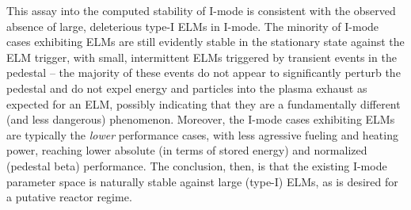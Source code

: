 This assay into the computed stability of I-mode is consistent with the observed absence of large, deleterious type-I ELMs in I-mode.  The minority of I-mode cases exhibiting ELMs are still evidently stable in the stationary state against the ELM trigger, with small, intermittent ELMs triggered by transient events in the pedestal -- the majority of these events do not appear to significantly perturb the pedestal and do not expel energy and particles into the plasma exhaust as expected for an ELM, possibly indicating that they are a fundamentally different (and less dangerous) phenomenon.  Moreover, the I-mode cases exhibiting ELMs are typically the \emph{lower} performance cases, with less agressive fueling and heating power, reaching lower absolute (in terms of stored energy) and normalized (pedestal beta) performance.  The conclusion, then, is that the existing I-mode parameter space is naturally stable against large (type-I) ELMs, as is desired for a putative reactor regime.\nicechapterending{}


